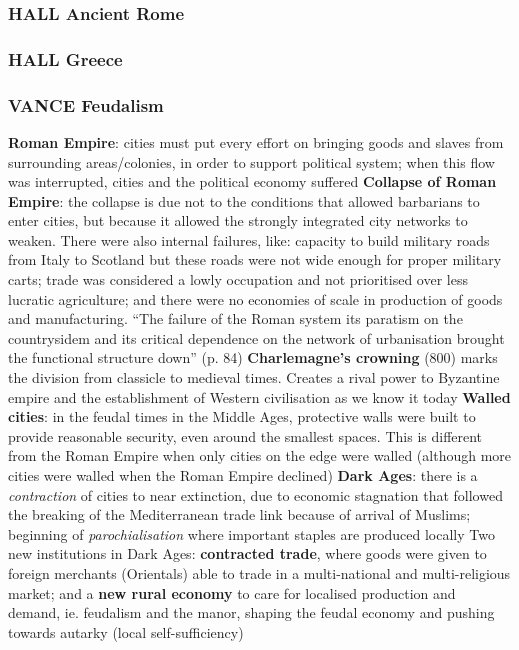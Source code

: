 \documentclass{article}
\begin{document}
\subsubsection{HALL Ancient Rome}

\subsubsection{HALL Greece}

\subsubsection{VANCE Feudalism}

\begin{outline}
	\1 \textbf{Roman Empire}: cities must put every effort on bringing goods and slaves from surrounding areas/colonies, in order to support political system; when this flow was interrupted, cities and the political economy suffered
		\2 \textbf{Collapse of Roman Empire}: the collapse is due not to the conditions that allowed barbarians to enter cities, but because it allowed the strongly integrated city networks to weaken. There were also internal failures, like: capacity to build military roads from Italy to Scotland but these roads were not wide enough for proper military carts; trade was considered a lowly occupation and not prioritised over less lucratic agriculture; and there were no economies of scale in production of goods and manufacturing. ``The failure of the Roman system its paratism on the countrysidem and its critical dependence on the network of urbanisation brought the functional structure down'' (p. 84)
		\2 \textbf{Charlemagne's crowning} (800) marks the division from classicle to medieval times. Creates a rival power to Byzantine empire and the establishment of Western civilisation as we know it today
	\1 \textbf{Walled cities}: in the feudal times in the Middle Ages, protective walls were built to provide reasonable security, even around the smallest spaces. This is different from the Roman Empire when only cities on the edge were walled (although more cities were walled when the Roman Empire declined)
	\1 \textbf{Dark Ages}: there is a \textit{contraction} of cities to near extinction, due to economic stagnation that followed the breaking of the Mediterranean trade link because of arrival of Muslims; beginning of \textit{parochialisation} where important staples are produced locally
		\2 Two new institutions in Dark Ages: \textbf{contracted trade}, where goods were given to foreign merchants (Orientals) able to trade in a multi-national and multi-religious market; and a \textbf{new rural economy} to care for localised production and demand, ie. feudalism and the manor, shaping the feudal economy and pushing towards autarky (local self-sufficiency)

\end{outline}
\end{document}
